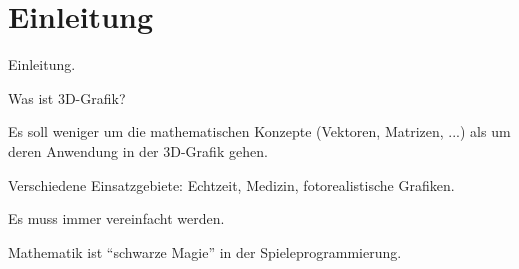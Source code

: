 \chapter{Einleitung}

Einleitung.

Was ist 3D-Grafik?

Es soll weniger um die mathematischen Konzepte (Vektoren, Matrizen, ...) als um deren Anwendung in der 3D-Grafik gehen.

Verschiedene Einsatzgebiete: Echtzeit, Medizin, fotorealistische Grafiken.

Es muss immer vereinfacht werden.

Mathematik ist \enquote{schwarze Magie} in der Spieleprogrammierung.